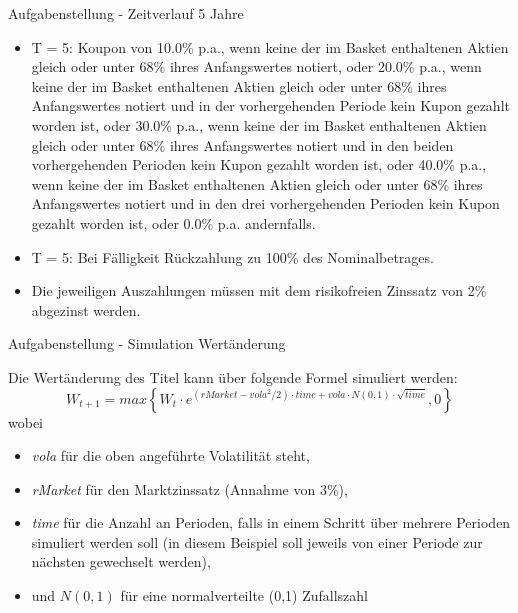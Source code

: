 \begin{frame}{Aufgabenstellung - Zeitverlauf 5 Jahre}
\begin{itemize}
	\item T = 5: Koupon von 10.0\% p.a., wenn keine der im Basket enthaltenen Aktien gleich
oder unter 68\% ihres Anfangswertes notiert, oder 20.0\% p.a., wenn keine der im
Basket enthaltenen Aktien gleich oder unter 68\% ihres Anfangswertes notiert und
in der vorhergehenden Periode kein Kupon gezahlt worden ist, oder 30.0\% p.a., wenn
keine der im Basket enthaltenen Aktien gleich oder unter 68\% ihres Anfangswertes
notiert und in den beiden vorhergehenden Perioden kein Kupon gezahlt worden ist,
oder 40.0\% p.a., wenn keine der im Basket enthaltenen Aktien gleich oder unter 68\%
ihres Anfangswertes notiert und in den drei vorhergehenden Perioden kein Kupon
gezahlt worden ist, oder 0.0\% p.a. andernfalls.
\end{itemize}

\begin{itemize}
	\item T = 5: Bei Fälligkeit Rückzahlung zu 100\% des Nominalbetrages.
	\item Die jeweiligen Auszahlungen müssen mit dem risikofreien Zinssatz von 2\% abgezinst werden.
\end{itemize}
\end{frame}

\begin{frame}{Aufgabenstellung - Simulation Wertänderung}

Die Wertänderung des Titel kann über folgende Formel simuliert werden:
\begin{equation*}
	W_{t+1} = max\left \{ W_t \cdot e^{(rMarket - vola^2/2) \cdot time + vola \cdot N(0,1) \cdot \sqrt{time}} , 0\right \}
\end{equation*}
wobei
\begin{itemize}
	\item \textit{vola} für die oben angeführte Volatilität steht,
	\item \textit{rMarket} für den Marktzinssatz (Annahme von 3\%),
	\item \textit{time} für die Anzahl an Perioden, falls in einem Schritt über mehrere Perioden simuliert werden soll (in diesem Beispiel soll jeweils von einer Periode zur nächsten gewechselt werden),
	\item und $N(0,1)$ für eine normalverteilte (0,1) Zufallszahl
\end{itemize}
\end{frame}


